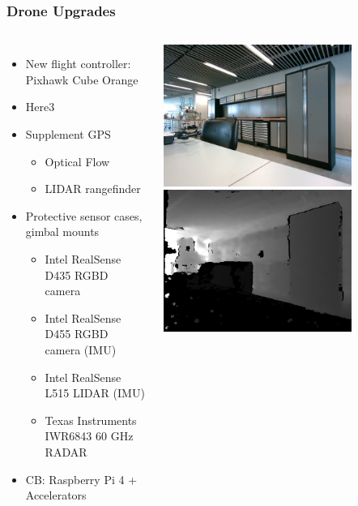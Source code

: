 \documentclass[aspectratio=169]{rubeamer}
\newif\ifpause
\newcommand{\mypause}{\ifpause \pause \fi}
\begin{document}
\begin{frame}
  \frametitle{Drone Upgrades}
  \begin{columns}
      \begin{itemize}
        \item New flight controller: Pixhawk Cube Orange
        \mypause
        \item Here3
        \mypause
        \item Supplement GPS
        \mypause
        \begin{itemize}
          \item Optical Flow
          \item LIDAR rangefinder
        \end{itemize}
        \mypause
        \item Protective sensor cases, gimbal mounts
        \mypause
        \begin{itemize}
          \item Intel RealSense D435 RGBD camera
          \item Intel RealSense D455 RGBD camera (IMU)
          \item Intel RealSense L515 LIDAR (IMU)
          \item Texas Instruments IWR6843 60 GHz RADAR
        \end{itemize}
        \mypause
        \item CB: Raspberry Pi 4 + Accelerators
      \end{itemize}
    \centering
    \includegraphics[width=0.75\textwidth]{rgb_image}\\
    \includegraphics[width=0.75\textwidth]{depth_image}
  \end{columns}
\end{frame}
\end{document}
